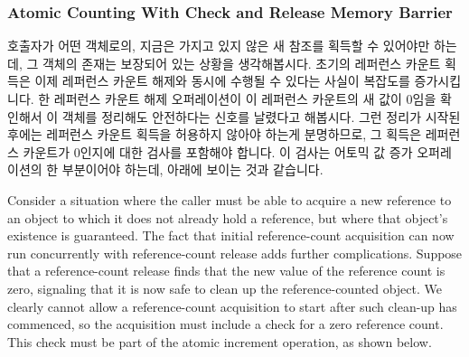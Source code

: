 \iffalse

The \co{dst_clone()} primitive may be used if the caller
already has a reference to the specified \co{dst_entry},
in which case it obtains another reference that may be handed off
to some other entity within the kernel.
Because a reference is already held by the caller, \co{dst_clone()}
need not execute any memory barriers.
The act of handing the \co{dst_entry} to some other entity might
or might not require a memory barrier, but if such a memory barrier
is required, it will be embedded in the mechanism used to hand the
\co{dst_entry} off.

\begin{fcvref}[ln:together:Linux Kernel dst-clone API]
The \co{dst_release()} primitive may be invoked from any environment,
and the caller might well reference elements of the \co{dst_entry}
structure immediately prior to the call to \co{dst_release()}.
The \co{dst_release()} primitive therefore contains a memory
barrier on \clnref{mb} preventing both the compiler and the CPU
from misordering accesses.
\end{fcvref}

Please note that the programmer making use of \co{dst_clone()} and
\co{dst_release()} need not be aware of the memory barriers, only
of the rules for using these two primitives.

\fi

\subsubsection{Atomic Counting With Check and Release Memory Barrier}
\label{sec:together:Atomic Counting With Check and Release Memory Barrier}

호출자가 어떤 객체로의, 지금은 가지고 있지 않은 새 참조를 획득할 수 있어야만
하는데, 그 객체의 존재는 보장되어 있는 상황을 생각해봅시다.
초기의 레퍼런스 카운트 획득은 이제 레퍼런스 카운트 해제와 동시에 수행될 수
있다는 사실이 복잡도를 증가시킵니다.
한 레퍼런스 카운트 해제 오퍼레이션이 이 레퍼런스 카운트의 새 값이 0임을
확인해서 이 객체를 정리해도 안전하다는 신호를 날렸다고 해봅시다.
그런 정리가 시작된 후에는 레퍼런스 카운트 획득을 허용하지 않아야 하는게
분명하므로, 그 획득은 레퍼런스 카운트가 0인지에 대한 검사를 포함해야 합니다.
이 검사는 어토믹 값 증가 오퍼레이션의 한 부분이어야 하는데, 아래에 보이는 것과
같습니다.

\iffalse

Consider a situation where the caller must be able to acquire a new
reference to an object to which it does not already hold a reference,
but where that object's existence is guaranteed.
The fact that initial reference-count acquisition can now run concurrently
with reference-count release adds further complications.
Suppose that a reference-count release finds that the new
value of the reference count is zero, signaling that it is
now safe to clean up the reference-counted object.
We clearly cannot allow a reference-count acquisition to
start after such clean-up has commenced, so the acquisition
must include a check for a zero reference count.
This check must be part of the atomic increment operation,
as shown below.


